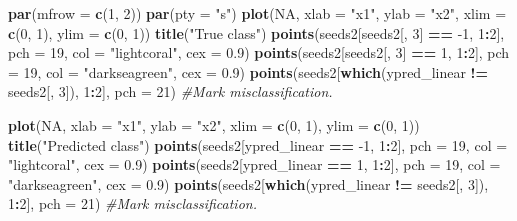 \documentclass[]{article}
\newenvironment{Shaded}{\begin{snugshade}}{\end{snugshade}}
\newcommand{\CommentTok}[1]{\textcolor[rgb]{0.56,0.35,0.01}{\textit{#1}}}
\newcommand{\DataTypeTok}[1]{\textcolor[rgb]{0.13,0.29,0.53}{#1}}
\newcommand{\DecValTok}[1]{\textcolor[rgb]{0.00,0.00,0.81}{#1}}
\newcommand{\FloatTok}[1]{\textcolor[rgb]{0.00,0.00,0.81}{#1}}
\newcommand{\KeywordTok}[1]{\textcolor[rgb]{0.13,0.29,0.53}{\textbf{#1}}}
\newcommand{\NormalTok}[1]{#1}
\newcommand{\OperatorTok}[1]{\textcolor[rgb]{0.81,0.36,0.00}{\textbf{#1}}}
\newcommand{\OtherTok}[1]{\textcolor[rgb]{0.56,0.35,0.01}{#1}}
\newcommand{\StringTok}[1]{\textcolor[rgb]{0.31,0.60,0.02}{#1}}
\begin{document}
\begin{Shaded}
\begin{Highlighting}[]
\KeywordTok{par}\NormalTok{(}\DataTypeTok{mfrow =} \KeywordTok{c}\NormalTok{(}\DecValTok{1}\NormalTok{, }\DecValTok{2}\NormalTok{))}
\KeywordTok{par}\NormalTok{(}\DataTypeTok{pty =} \StringTok{"s"}\NormalTok{)}
\KeywordTok{plot}\NormalTok{(}\OtherTok{NA}\NormalTok{, }\DataTypeTok{xlab =} \StringTok{"x1"}\NormalTok{, }\DataTypeTok{ylab =} \StringTok{"x2"}\NormalTok{, }\DataTypeTok{xlim =} \KeywordTok{c}\NormalTok{(}\DecValTok{0}\NormalTok{, }\DecValTok{1}\NormalTok{), }\DataTypeTok{ylim =} \KeywordTok{c}\NormalTok{(}\DecValTok{0}\NormalTok{, }\DecValTok{1}\NormalTok{))}
\KeywordTok{title}\NormalTok{(}\StringTok{"True class"}\NormalTok{)}
\KeywordTok{points}\NormalTok{(seeds2[seeds2[, }\DecValTok{3}\NormalTok{] }\OperatorTok{==}\StringTok{ }\DecValTok{-1}\NormalTok{, }\DecValTok{1}\OperatorTok{:}\DecValTok{2}\NormalTok{], }\DataTypeTok{pch =} \DecValTok{19}\NormalTok{, }\DataTypeTok{col =} \StringTok{"lightcoral"}\NormalTok{, }
    \DataTypeTok{cex =} \FloatTok{0.9}\NormalTok{)}
\KeywordTok{points}\NormalTok{(seeds2[seeds2[, }\DecValTok{3}\NormalTok{] }\OperatorTok{==}\StringTok{ }\DecValTok{1}\NormalTok{, }\DecValTok{1}\OperatorTok{:}\DecValTok{2}\NormalTok{], }\DataTypeTok{pch =} \DecValTok{19}\NormalTok{, }\DataTypeTok{col =} \StringTok{"darkseagreen"}\NormalTok{, }
    \DataTypeTok{cex =} \FloatTok{0.9}\NormalTok{)}
\KeywordTok{points}\NormalTok{(seeds2[}\KeywordTok{which}\NormalTok{(ypred_linear }\OperatorTok{!=}\StringTok{ }\NormalTok{seeds2[, }\DecValTok{3}\NormalTok{]), }\DecValTok{1}\OperatorTok{:}\DecValTok{2}\NormalTok{], }\DataTypeTok{pch =} \DecValTok{21}\NormalTok{)  }\CommentTok{#Mark misclassification.}

\KeywordTok{plot}\NormalTok{(}\OtherTok{NA}\NormalTok{, }\DataTypeTok{xlab =} \StringTok{"x1"}\NormalTok{, }\DataTypeTok{ylab =} \StringTok{"x2"}\NormalTok{, }\DataTypeTok{xlim =} \KeywordTok{c}\NormalTok{(}\DecValTok{0}\NormalTok{, }\DecValTok{1}\NormalTok{), }\DataTypeTok{ylim =} \KeywordTok{c}\NormalTok{(}\DecValTok{0}\NormalTok{, }\DecValTok{1}\NormalTok{))}
\KeywordTok{title}\NormalTok{(}\StringTok{"Predicted class"}\NormalTok{)}
\KeywordTok{points}\NormalTok{(seeds2[ypred_linear }\OperatorTok{==}\StringTok{ }\DecValTok{-1}\NormalTok{, }\DecValTok{1}\OperatorTok{:}\DecValTok{2}\NormalTok{], }\DataTypeTok{pch =} \DecValTok{19}\NormalTok{, }\DataTypeTok{col =} \StringTok{"lightcoral"}\NormalTok{, }
    \DataTypeTok{cex =} \FloatTok{0.9}\NormalTok{)}
\KeywordTok{points}\NormalTok{(seeds2[ypred_linear }\OperatorTok{==}\StringTok{ }\DecValTok{1}\NormalTok{, }\DecValTok{1}\OperatorTok{:}\DecValTok{2}\NormalTok{], }\DataTypeTok{pch =} \DecValTok{19}\NormalTok{, }\DataTypeTok{col =} \StringTok{"darkseagreen"}\NormalTok{, }
    \DataTypeTok{cex =} \FloatTok{0.9}\NormalTok{)}
\KeywordTok{points}\NormalTok{(seeds2[}\KeywordTok{which}\NormalTok{(ypred_linear }\OperatorTok{!=}\StringTok{ }\NormalTok{seeds2[, }\DecValTok{3}\NormalTok{]), }\DecValTok{1}\OperatorTok{:}\DecValTok{2}\NormalTok{], }\DataTypeTok{pch =} \DecValTok{21}\NormalTok{)  }\CommentTok{#Mark misclassification.}
\end{Highlighting}
\end{Shaded}
\end{document}
